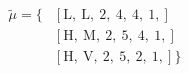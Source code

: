 \begin{equation}
\nonumber
\begin{aligned}
\tilde{\mu} = \{  & \left[\text{L}, \ \text{L}, \ \text{2}, \ \text{4}, \ \text{4}, \ \text{1}, \right] \\  & \left[\text{H}, \ \text{M}, \ \text{2}, \ \text{5}, \ \text{4}, \ \text{1}, \right] \\  & \left[\text{H}, \ \text{V}, \ \text{2}, \ \text{5}, \ \text{2}, \ \text{1}, \right] \} \\ 
\end{aligned}
\end{equation} \\ 